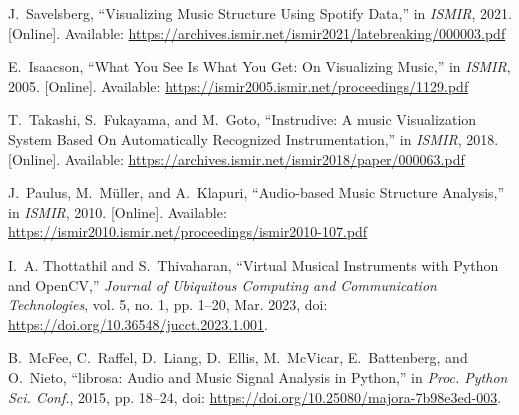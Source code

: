 \documentclass{article}
\begin{document}

% 

\iffalse
**double check if titles of papers are right format.
i just capitalized first letter of every word but ye
\fi

\newpage
\begin{thebibliography}{citations}


J.~Savelsberg, ``Visualizing Music Structure Using Spotify Data,''
in {\em ISMIR}, 2021. [Online]. Available: \url{https://archives.ismir.net/ismir2021/latebreaking/000003.pdf}

E.~Isaacson, ``What You See Is What You Get: On Visualizing Music,''
in {\em ISMIR}, 2005. [Online]. Available: \url{https://ismir2005.ismir.net/proceedings/1129.pdf}

T.~Takashi, S.~Fukayama, and M.~Goto, ``Instrudive: A music Visualization System Based On Automatically Recognized Instrumentation,''
in {\em ISMIR}, 2018. [Online]. Available: \url{https://archives.ismir.net/ismir2018/paper/000063.pdf}

J.~Paulus, M.~M\"uller, and A.~Klapuri, ``Audio-based Music Structure Analysis,''
in {\em ISMIR}, 2010. [Online]. Available: \url{https://ismir2010.ismir.net/proceedings/ismir2010-107.pdf}

I.~A. Thottathil and S.~Thivaharan, ``Virtual Musical Instruments with Python and OpenCV,'' \emph{Journal of Ubiquitous Computing and Communication Technologies}, vol. 5, no. 1, pp. 1–20, Mar. 2023, doi: \url{https://doi.org/10.36548/jucct.2023.1.001}.

B.~McFee, C.~Raffel, D.~Liang, D.~Ellis, M.~McVicar, E.~Battenberg, and O.~Nieto, ``librosa: Audio and Music Signal Analysis in Python,'' in \emph{Proc. Python Sci. Conf.}, 2015, pp. 18–24, doi: \url{https://doi.org/10.25080/majora-7b98e3ed-003}.


\end{thebibliography}
\end{document}
